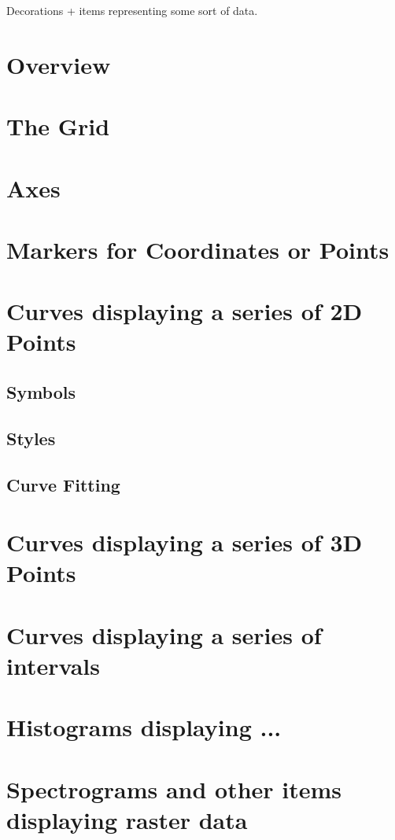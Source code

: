 \documentclass[12pt,a4paper]{book}
\begin{document}
Decorations + items representing some sort of data.

\section{Overview}
\section{The Grid}
\section{Axes}

\section{Markers for Coordinates or Points}
\section{Curves displaying a series of 2D Points}

\subsection{Symbols}
\subsection{Styles}
\subsection{Curve Fitting}


\section{Curves displaying a series of 3D Points}
\section{Curves displaying a series of intervals}
\section{Histograms displaying ...}

\section{Spectrograms and other items displaying raster data}
\end{document}
